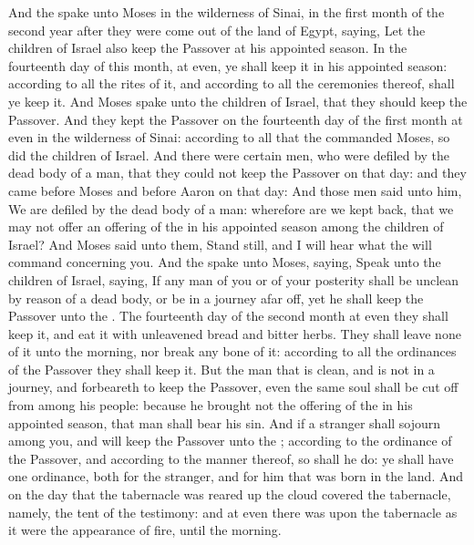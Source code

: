 \begin{biblechapter} %
 And the \LORD spake unto Moses in the wilderness of Sinai, in the first month of the second year after they were come out of the land of Egypt, saying,
\verse Let the children of Israel also keep the Passover at his appointed season.
\verse In the fourteenth day of this month, at even, ye shall keep it in his appointed season: according to all the rites of it, and according to all the ceremonies thereof, shall ye keep it.
\verse And Moses spake unto the children of Israel, that they should keep the Passover.
\verse And they kept the Passover on the fourteenth day of the first month at even in the wilderness of Sinai: according to all that the \LORD commanded Moses, so did the children of Israel.
\verse And there were certain men, who were defiled by the dead body of a man, that they could not keep the Passover on that day: and they came before Moses and before Aaron on that day:
\verse And those men said unto him, We are defiled by the dead body of a man: wherefore are we kept back, that we may not offer an offering of the \LORD in his appointed season among the children of Israel?
\verse And Moses said unto them, Stand still, and I will hear what the \LORD will command concerning you.
\verse And the \LORD spake unto Moses, saying,
\verse Speak unto the children of Israel, saying, If any man of you or of your posterity shall be unclean by reason of a dead body, or be in a journey afar off, yet he shall keep the Passover unto the \LORD.
\verse The fourteenth day of the second month at even they shall keep it, and eat it with unleavened bread and bitter herbs.
\verse They shall leave none of it unto the morning, nor break any bone of it: according to all the ordinances of the Passover they shall keep it.
\verse But the man that is clean, and is not in a journey, and forbeareth to keep the Passover, even the same soul shall be cut off from among his people: because he brought not the offering of the \LORD in his appointed season, that man shall bear his sin.
\verse And if a stranger shall sojourn among you, and will keep the Passover unto the \LORD; according to the ordinance of the Passover, and according to the manner thereof, so shall he do: ye shall have one ordinance, both for the stranger, and for him that was born in the land.
 And on the day that the tabernacle was reared up the cloud covered the tabernacle, namely, the tent of the testimony: and at even there was upon the tabernacle as it were the appearance of fire, until the morning.

\end{biblechapter}
